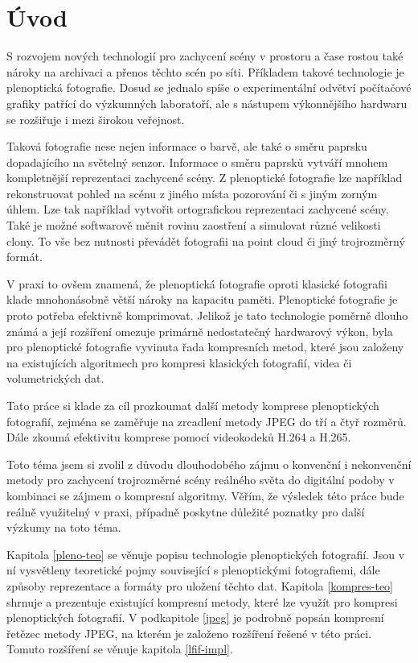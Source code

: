 
\chapter{Úvod}
S rozvojem nových technologií pro zachycení scény v prostoru a čase rostou také nároky na archivaci a přenos těchto scén po síti.
Příkladem takové technologie je plenoptická fotografie.
Dosud se jednalo spíše o experimentální odvětví počítačové grafiky patřící do výzkumných laboratoří, ale s nástupem výkonnějšího hardwaru se rozšiřuje i mezi širokou veřejnost.

Taková fotografie nese nejen informace o barvě, ale také o směru paprsku dopadajícího na světelný senzor.
Informace o směru paprsků vytváří mnohem kompletnější reprezentaci zachycené scény.
Z plenoptické fotografie lze například rekonstruovat pohled na scénu z jiného místa pozorování či s jiným zorným úhlem.
Lze tak například vytvořit ortografickou reprezentaci zachycené scény.
Také je možné softwarově měnit rovinu zaostření a simulovat různé velikosti clony.
To vše bez nutnosti převádět fotografii na point cloud či jiný trojrozměrný formát.

V praxi to ovšem znamená, že plenoptická fotografie oproti klasické fotografii klade mnohonásobně větší nároky na kapacitu paměti.
Plenoptické fotografie je proto potřeba efektivně komprimovat.
Jelikož je tato technologie poměrně dlouho známá a její rozšíření omezuje primárně nedostatečný hardwarový výkon, byla pro plenoptické fotografie vyvinuta řada kompresních metod, které jsou založeny na existujících algoritmech pro kompresi klasických fotografií, videa či volumetrických dat.

Tato práce si klade za cíl prozkoumat další metody komprese plenoptických fotografií, zejména se zaměřuje na zrcadlení metody JPEG do tří a čtyř rozměrů.
Dále zkoumá efektivitu komprese pomocí videokodeků H.264 a H.265.

Toto téma jsem si zvolil z důvodu dlouhodobého zájmu o konvenční i nekonvenční metody pro zachycení trojrozměrné scény reálného světa do digitální podoby v kombinaci se zájmem o kompresní algoritmy.
Věřím, že výsledek této práce bude reálně využitelný v praxi, případně poskytne důležité poznatky pro další výzkumy na toto téma.

Kapitola \ref{pleno-teo} se věnuje popisu technologie plenoptických fotografií.
Jsou v ní vysvětleny teoretické pojmy související s plenoptickými fotografiemi, dále způsoby reprezentace a formáty pro uložení těchto dat.
Kapitola \ref{kompres-teo} shrnuje a prezentuje existující kompresní metody, které lze využít pro kompresi plenoptických fotografií.
V podkapitole \ref{jpeg} je podrobně popsán kompresní řetězec metody JPEG, na kterém je založeno rozšíření řešené v této práci.
Tomuto rozšíření se věnuje kapitola \ref{lfif-impl}.



